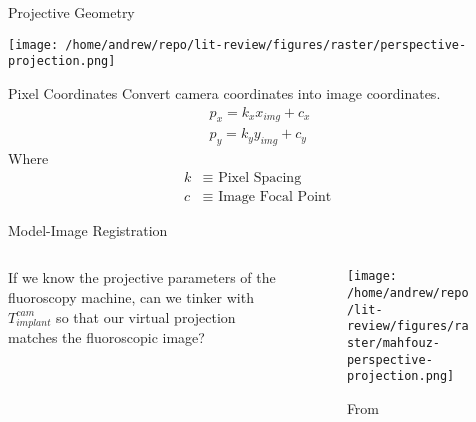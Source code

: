 \documentclass[presentation, aspectratio=1610]{beamer}
\begin{document}
\begin{frame}[label={sec:org5cc1d08}]{Projective Geometry}
\begin{center}
\texttt{[image: /home/andrew/repo/lit-review/figures/raster/perspective-projection.png]}
\end{center}
\end{frame}
\begin{frame}[label={sec:org392278b}]{Pixel Coordinates}
Convert camera coordinates into image coordinates.
\begin{equation*}
  \begin{aligned}
    p_{x} = k_{x}x_{img} + c_{x} \\
    p_{y} = k_{y}y_{img} + c_{y}
  \end{aligned}
\end{equation*}
Where
\begin{equation*}
  \begin{aligned}
    k &\equiv \text{ Pixel Spacing }\\
    c &\equiv \text{ Image Focal Point }
  \end{aligned}
\end{equation*}
\end{frame}

\begin{frame}[label={sec:org1fb4f11}]{Model-Image Registration}
\begin{columns}
\begin{column}{0.5\columnwidth}
If we know the projective parameters of the fluoroscopy machine, can we tinker with \(T^{cam}_{implant}\) so that our virtual projection matches the fluoroscopic image?
\end{column}
\begin{column}{0.6\columnwidth}
\begin{figure}[htbp]
\centering
\texttt{[image: /home/andrew/repo/lit-review/figures/raster/mahfouz-perspective-projection.png]}
\caption{From \autocite{mahfouzRobustMethodRegistration2003}}
\end{figure}
\end{column}
\end{columns}
\end{frame}
\end{document}
